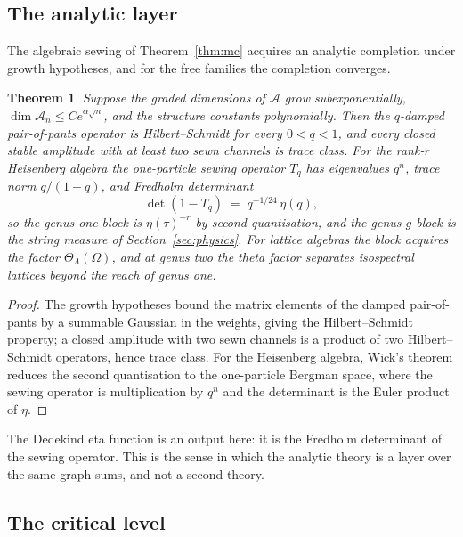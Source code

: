 \documentclass[11pt]{amsart}
\numberwithin{equation}{section}
\theoremstyle{plain}
\newtheorem{theorem}{Theorem}[section]
\theoremstyle{definition}
\theoremstyle{remark}
\newcommand{\cA}{\mathcal{A}}
\begin{document}
\subsection{The analytic layer}

The algebraic sewing of Theorem~\ref{thm:mc} acquires an analytic
completion under growth hypotheses, and for the free families the
completion converges.

\begin{theorem}\label{thm:sewing}
Suppose the graded dimensions of $\cA$ grow subexponentially,
$\dim\cA_n\leq Ce^{\alpha\sqrt n}$, and the structure constants
polynomially. Then the $q$-damped pair-of-pants operator is
Hilbert--Schmidt for every $0<q<1$, and every closed stable amplitude
with at least two sewn channels is trace class. For the rank-$r$
Heisenberg algebra the one-particle sewing operator $T_q$ has
eigenvalues $q^{n}$, trace norm $q/(1-q)$, and Fredholm determinant
\begin{equation}
\det(1-T_q)\;=\;q^{-1/24}\,\eta(q),
\end{equation}
so the genus-one block is $\eta(\tau)^{-r}$ by second quantisation,
and the genus-$g$ block is the string measure of
Section~\ref{sec:physics}. For lattice algebras the block acquires the
factor $\Theta_\Lambda(\Omega)$, and at genus two the theta factor
separates isospectral lattices beyond the reach of genus one.
\end{theorem}

\begin{proof}
The growth hypotheses bound the matrix elements of the damped
pair-of-pants by a summable Gaussian in the weights, giving the
Hilbert--Schmidt property; a closed amplitude with two sewn channels
is a product of two Hilbert--Schmidt operators, hence trace class.
For the Heisenberg algebra, Wick's theorem reduces the second
quantisation to the one-particle Bergman space, where the sewing
operator is multiplication by $q^{n}$ and the determinant is the
Euler product of $\eta$.
\end{proof}

The Dedekind eta function is an output here: it is the Fredholm
determinant of the sewing operator. This is the sense in which the
analytic theory is a layer over the same graph sums, and not a second
theory.

\subsection{The critical level}
\end{document}
